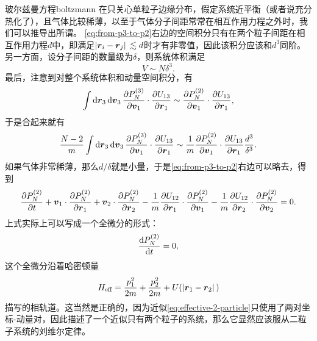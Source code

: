 \begin{back}{玻尔兹曼方程}{boltzmann}
    在只关心单粒子边缘分布，假定系统近平衡（或者说充分热化了），且气体比较稀薄，以至于气体分子间距常常在相互作用力程之外时，我们可以推导出所谓。
    \eqref{eq:from-p3-to-p2}右边的空间积分只有在两个粒子间距在相互作用力程$d$中，即满足$\abs*{\vb*{r}_i - \vb*{r}_j} \lesssim d$时才有非零值，因此该积分应该和$d^3$同阶。另一方面，设分子间距的数量级为$\delta$，则系统体积满足
    \[
        V \sim N \delta^3.
    \]
    最后，注意到对整个系统体积和动量空间积分，有
    \[
        \int \dd{\vb*{r}_3} \dd{\vb*{v}_3} \pdv{P_N^{(3)}}{\vb*{v}_1} \cdot \pdv{U_{13}}{\vb*{r}_1} \sim \pdv{P_N^{(2)}}{\vb*{v}_1} \cdot \pdv{U_{13}}{\vb*{r}_1},
    \]
    于是合起来就有
    \[
        \frac{N-2}{m} \int \dd{\vb*{r}_3} \dd{\vb*{v}_3} \pdv{P_N^{(3)}}{\vb*{v}_1} \cdot \pdv{U_{13}}{\vb*{r}_1} \sim \frac{1}{m} \pdv{P_N^{(2)}}{\vb*{v}_1} \cdot \pdv{U_{13}}{\vb*{r}_1} \frac{d^3}{\delta^3}.
    \]
    如果气体非常稀薄，那么$d/\delta$就是小量，于是\eqref{eq:from-p3-to-p2}右边可以略去，得到
    \begin{equation}
        \pdv{P_N^{(2)}}{t} 
        + \vb*{v}_1 \cdot \pdv{P_N^{(2)}}{\vb*{r}_1} 
        + \vb*{v}_2 \cdot \pdv{P_N^{(2)}}{\vb*{r}_2} 
        - \frac{1}{m} \pdv{U_{12}}{\vb*{r}_1} \cdot \pdv{P_N^{(2)}}{\vb*{v}_1} 
        - \frac{1}{m} \pdv{U_{12}}{\vb*{r}_2} \cdot \pdv{P_N^{(2)}}{\vb*{v}_2} = 0.
        \label{eq:effective-2-particle}
    \end{equation}
    上式实际上可以写成一个全微分的形式：
    \begin{equation}
        \dv{P_N^{(2)}}{t}=0,
        \label{eq:pn2-constant}
    \end{equation}
    这个全微分沿着哈密顿量
    \begin{equation}
        H_\text{eff} = \frac{p_1^2}{2m} + \frac{p_2^2}{2m} + U(\abs*{\vb*{r}_1 - \vb*{r}_2})
        \label{eq:2-particle-hamiltonian}
    \end{equation}
    描写的相轨道。这当然是正确的，因为近似\eqref{eq:effective-2-particle}只使用了两对坐标-动量对，因此描述了一个近似只有两个粒子的系统，那么它显然应该服从二粒子系统的刘维尔定律。


\end{back}
